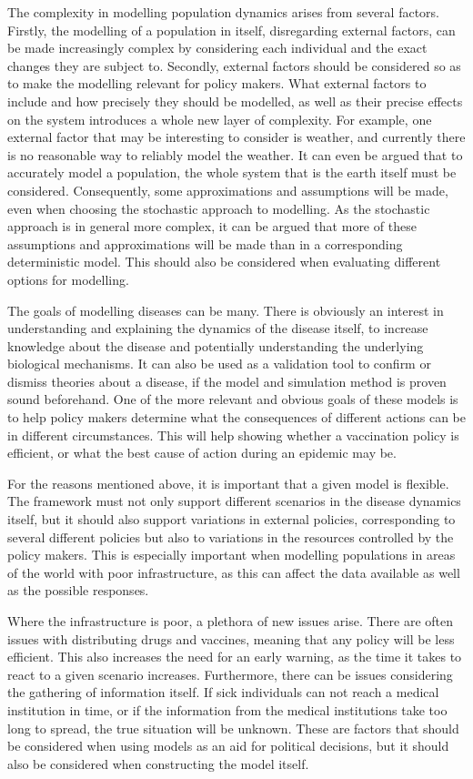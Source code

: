 \documentclass[10pt,a4paper]{article}
\begin{document}
The complexity in modelling population dynamics arises from several factors. Firstly, the modelling of a population in itself, disregarding external factors, can be made increasingly complex by considering each individual and the exact changes they are subject to. Secondly, external factors should be considered so as to make the modelling relevant for policy makers. What external factors to include and how precisely they should be modelled, as well as their precise effects on the system introduces a whole new layer of complexity. For example, one external factor that may be interesting to consider is weather, and currently there is no reasonable way to reliably model the weather. It can even be argued that to accurately model a population, the whole system that is the earth itself must be considered. Consequently, some approximations and assumptions will be made, even when choosing the stochastic approach to modelling. As the stochastic approach is in general more complex, it can be argued that more of these assumptions and approximations will be made than in a corresponding deterministic model. This should also be considered when evaluating different options for modelling.

The goals of modelling diseases can be many. There is obviously an interest in understanding and explaining the dynamics of the disease itself, to increase knowledge about the disease and potentially understanding the underlying biological mechanisms. It can also be used as a validation tool to confirm or dismiss theories about a disease, if the model and simulation method is proven sound beforehand. One of the more relevant and obvious goals of these models is to help policy makers determine what the consequences of different actions can be in different circumstances. This will help showing whether a vaccination policy is efficient, or what the best cause of action during an epidemic may be.

For the reasons mentioned above, it is important that a given model is flexible. The framework must not only support different scenarios in the disease dynamics itself, but it should also support variations in external policies, corresponding to several different policies but also to variations in the resources controlled by the policy makers. This is especially important when modelling populations in areas of the world with poor infrastructure, as this can affect the data available as well as the possible responses.

Where the infrastructure is poor, a plethora of new issues arise. There are often issues with distributing drugs and vaccines, meaning that any policy will be less efficient. This also increases the need for an early warning, as the time it takes to react to a given scenario increases. Furthermore, there can be issues considering the gathering of information itself. If sick individuals can not reach a medical institution in time, or if the information from the medical institutions take too long to spread, the true situation will be unknown. These are factors that should be considered when using models as an aid for political decisions, but it should also be considered when constructing the model itself.
\end{document}

